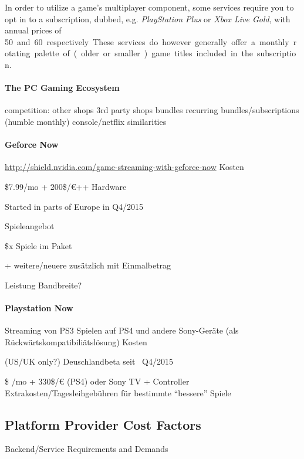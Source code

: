 In order to utilize a game's multiplayer component, some services require you to opt in to a subscription, dubbed, e.g. \textit{PlayStation Plus} or \textit{Xbox Live Gold}, with annual prices of \SI{50}[\EUR] and \SI{60}[\EUR] respectively. These services do however generally offer a monthly rotating palette of (older or smaller) game titles included in the subscription.





\paragraph{The PC Gaming Ecosystem}

competition:
other shops
3rd party shops
bundles
recurring bundles/subscriptions (humble monthly)
	console/netflix similarities




\paragraph{Geforce Now}
\url{http://shield.nvidia.com/game-streaming-with-geforce-now}
Kosten

\$7.99/mo + 200\$/€++ Hardware

Started in parts of Europe in Q4/2015

Spieleangebot

\$x Spiele im Paket

 + weitere/neuere zusätzlich mit Einmalbetrag

Leistung
Bandbreite? 

\paragraph{Playstation Now}
Streaming von PS3 Spielen auf PS4 und andere Sony-Geräte (als Rückwärtskompatibiliätslösung)
Kosten

(US/UK only?) Deuschlandbeta seit ~Q4/2015

\$ /mo + 330\$/€ (PS4) oder Sony TV + Controller
Extrakosten/Tagesleihgebühren für bestimmte ``bessere'' Spiele




\subsection{Platform Provider Cost Factors}
Backend/Service Requirements and Demands

